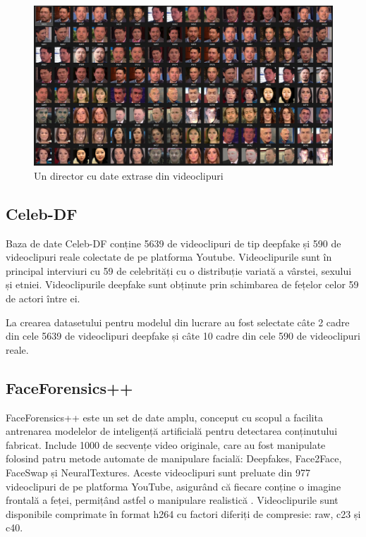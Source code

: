 \begin{figure}[h]
         \centering 
         \includegraphics[width=0.75\linewidth]{images/dataset_ss.png}
         \captionsetup{font=footnotesize}
         \caption{Un director cu date extrase din videoclipuri}
\end{figure}

\subsection{Celeb-DF}

Baza de date Celeb-DF conține 5639 de videoclipuri de tip deepfake și 590 de videoclipuri reale colectate de pe platforma Youtube. Videoclipurile sunt în principal interviuri cu 59 de celebrități cu o distribuție variată a vârstei, sexului și etniei. Videoclipurile deepfake sunt obținute prin schimbarea de fețelor celor 59 de actori între ei. 

La crearea datasetului pentru modelul din lucrare au fost selectate câte 2 cadre din cele 5639 de videoclipuri deepfake și câte 10 cadre din cele 590 de videoclipuri reale. 

\newpage
\subsection{FaceForensics++}

FaceForensics++ este un set de date amplu, conceput cu scopul a facilita antrenarea modelelor de inteligență artificială pentru detectarea conținutului fabricat. Include 1000 de secvențe video originale, care au fost manipulate folosind patru metode automate de manipulare facială: Deepfakes, Face2Face, FaceSwap și NeuralTextures. Aceste videoclipuri sunt preluate din 977 videoclipuri de pe platforma YouTube, asigurând că fiecare conține o imagine frontală a feței, permițând astfel o manipulare realistică . Videoclipurile sunt disponibile comprimate în format h264 cu factori diferiți de compresie: raw, c23 și c40.

